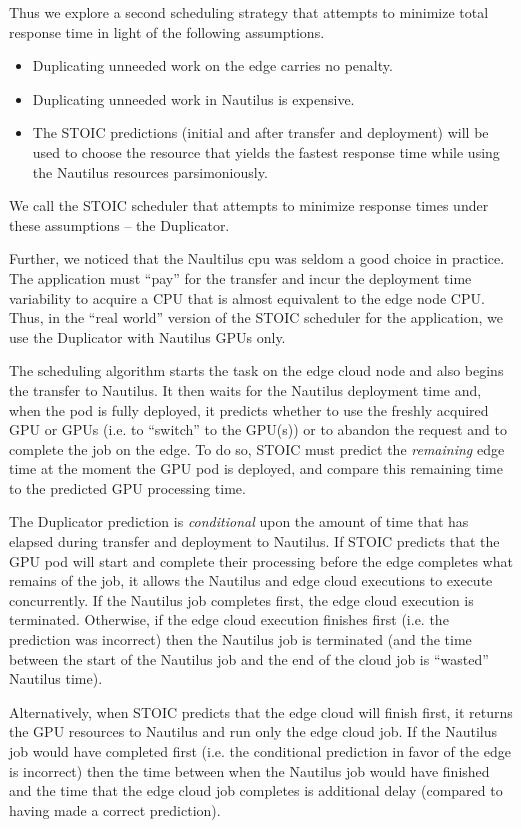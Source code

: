 Thus we explore a second scheduling strategy that attempts to minimize total
response time in light of the following assumptions.
\begin{itemize}
\item Duplicating unneeded work on the edge carries no penalty.
\item Duplicating unneeded work in Nautilus is expensive.
\item The STOIC predictions (initial and after transfer and deployment) will be used to
choose the resource that yields the fastest response time while using the
Nautilus resources parsimoniously.
\end{itemize}
We call the STOIC scheduler that attempts to minimize response times under these assumptions -- the Duplicator.

Further, we noticed that the Naultilus cpu was seldom a good choice in
practice. The application must ``pay'' for the transfer and incur the
deployment time variability to acquire a CPU that is almost equivalent to the
edge node CPU.  Thus, in the ``real world'' version of the STOIC scheduler for
the application, we use the Duplicator with Nautilus GPUs only.

The scheduling algorithm starts the task on the edge cloud node and also
begins the transfer to Nautilus. It then waits for the Nautilus deployment
time and, when the pod is fully deployed, it predicts whether to use the
freshly acquired GPU or GPUs (i.e. to ``switch'' to the GPU(s)) or to abandon
the request and to complete the job on the edge.  To do so, STOIC must predict
the \textit{remaining} edge time at the moment the GPU pod is deployed, and
compare this remaining time to the predicted GPU processing time.  

The Duplicator prediction is \textit{conditional} upon the amount of time that
has elapsed during transfer and deployment to Nautilus. If STOIC predicts that
the GPU pod will start and complete their processing before the edge completes
what remains of the job, it allows the Nautilus and edge cloud executions to
execute concurrently. If the Nautilus job completes first, the edge cloud
execution is terminated.  Otherwise, if the edge cloud execution finishes
first (i.e. the prediction was incorrect) then the Nautilus job is terminated
(and the time between the start of the Nautilus job and the end of the cloud
job is ``wasted'' Nautilus time).

Alternatively, when STOIC predicts that the edge cloud will finish first, it
returns the GPU resources to Nautilus and run only the edge cloud job. If the
Nautilus job would have completed first (i.e. the conditional prediction in
favor of the edge is incorrect) then the time between when the Nautilus job
would have finished and the time that the edge cloud job completes is
additional delay (compared to having made a correct prediction).

